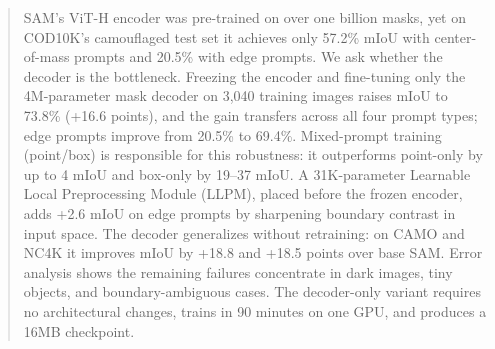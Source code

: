 \begin{abstract}
SAM's ViT-H encoder was pre-trained on over one billion masks, yet on COD10K's camouflaged test set it achieves only 57.2\% mIoU with center-of-mass prompts and 20.5\% with edge prompts. We ask whether the decoder is the bottleneck. Freezing the encoder and fine-tuning only the 4M-parameter mask decoder on 3,040 training images raises mIoU to 73.8\% (+16.6 points), and the gain transfers across all four prompt types; edge prompts improve from 20.5\% to 69.4\%. Mixed-prompt training (point/box) is responsible for this robustness: it outperforms point-only by up to 4 mIoU and box-only by 19--37 mIoU. A 31K-parameter Learnable Local Preprocessing Module (LLPM), placed before the frozen encoder, adds +2.6 mIoU on edge prompts by sharpening boundary contrast in input space. The decoder generalizes without retraining: on CAMO and NC4K it improves mIoU by +18.8 and +18.5 points over base SAM. Error analysis shows the remaining failures concentrate in dark images, tiny objects, and boundary-ambiguous cases. The decoder-only variant requires no architectural changes, trains in 90 minutes on one GPU, and produces a 16MB checkpoint.
\end{abstract}

